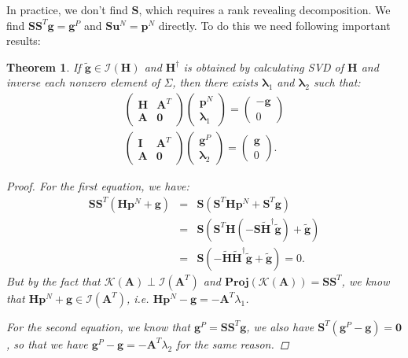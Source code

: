 \documentclass[annual]{acmsiggraph}
\newcommand{\E}[1]{\mathbf{#1}}
\newcommand{\TWOC}[2]{\left(\begin{array}{c}#1 \\ #2\end{array}\right)}
\newcommand{\MTT}[4]{\left(\begin{array}{cc}#1 & #2 \\ #3 & #4\end{array}\right)}
\newtheorem{myTheo}{Theorem}
\begin{document}
In practice, we don't find $\E{S}$, which requires a rank revealing decomposition. We find $\E{S}\E{S}^T\E{g}=\E{g}^P$ and $\E{S}\E{u}^N=\E{p}^N$ directly. To do this we need following important results:
\begin{myTheo}
\label{Thm:THEO}
If $\tilde{\E{g}} \in \mathcal{I}(\E{H})$ and $\E{H}^\dagger$ is obtained by calculating SVD of $\E{H}$ and inverse each nonzero element of $\Sigma$, then there exists $\E{\lambda}_1$ and $\E{\lambda}_2$ such that:
\begin{eqnarray*}
\MTT{\E{H}}{\E{A}^T}{\E{A}}{\E{0}}\TWOC{\E{p}^N}{\E{\lambda}_1}=\TWOC{-\E{g}}{0}	\\
\MTT{\E{I}}{\E{A}^T}{\E{A}}{\E{0}}\TWOC{\E{g}^P}{\E{\lambda}_2}=\TWOC{\E{g}}{0}.
\end{eqnarray*}
\begin{proof}
For the first equation, we have:
\begin{eqnarray*}
\E{S}\E{S}^T(\E{H}\E{p}^N+\E{g})&=&\E{S}(\E{S}^T\E{H}\E{p}^N+\E{S}^T\E{g})	\\
&=&\E{S}(\E{S}^T\E{H}(-\E{S}\tilde{\E{H}}^\dagger\tilde{\E{g}})+\tilde{\E{g}})	\\
&=&\E{S}(-\tilde{\E{H}}\tilde{\E{H}}^\dagger\tilde{\E{g}}+\tilde{\E{g}})=0.
\end{eqnarray*}
But by the fact that $\mathcal{K}(\E{A})\perp\mathcal{I}(\E{A}^T)$ and $\E{Proj}(\mathcal{K}(\E{A}))=\E{S}\E{S}^T$, we know that $\E{H}\E{p}^N+\E{g} \in \mathcal{I}(\E{A}^T)$, i.e. $\E{H}\E{p}^N-\E{g}=-\E{A}^T\lambda_1$.

For the second equation, we know that $\E{g}^P=\E{S}\E{S}^T\E{g}$, we also have $\E{S}^T(\E{g}^P-\E{g})=\E{0}$, so that we have $\E{g}^P-\E{g}=-\E{A}^T\lambda_2$ for the same reason.
\end{proof}
\end{myTheo}
\end{document}
